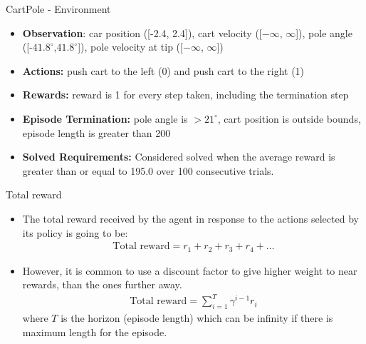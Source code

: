 \documentclass[10pt,mathserif]{beamer}
\begin{document}
\begin{frame}{CartPole - Environment}
\begin{itemize}
\item \textbf{Observation}: car position ([-2.4, 2.4]), cart velocity ([$-\infty$, $\infty$]), pole angle ([-$41.8^{\circ}$,$41.8^{\circ}$]), pole velocity at tip ([$-\infty$, $\infty$])
\item \textbf{Actions:} push cart to the left (0) and push cart to the right (1)
\item \textbf{Rewards:} reward is 1 for every step taken, including the termination step
\item \textbf{Episode Termination:} pole angle is $> 21^{\circ}$, cart position is outside bounds, episode length is greater than 200
\item \textbf{Solved Requirements:} Considered solved when the average reward is greater than or equal to 195.0 over 100 consecutive trials.
\end{itemize}
\end{frame}



\begin{frame}{Total reward}
\begin{itemize}
\item The total reward received by the agent in response to the actions selected by its policy is going to be:
\begin{align}
\text{Total reward} = r_1 + r_2 + r_3 + r_4 + \dots
\end{align}
\item However, it is common to use a discount factor to give higher weight to near rewards, than the ones further away.
\begin{align}
\text{Total reward}  = \sum_{i=1}^T \gamma^{i-1}r_i
\end{align}
where $T$ is the horizon (episode length) which can be infinity if there is maximum length for the episode.
\end{itemize}
\end{frame}
\end{document}
